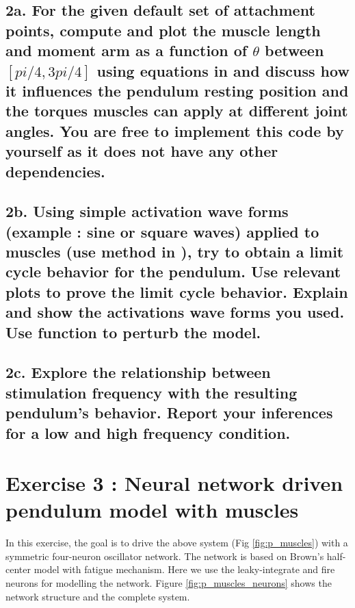 \documentclass{cmc}
\begin{document}
\label{sec:questions}

\subsection*{2a. For the given default set of attachment points,
  compute and plot the muscle length and moment arm as a function of
  $\theta$ between $[pi/4, 3pi/4]$ using equations in
   and discuss how it influences the pendulum
  resting position and the torques muscles can apply at different
  joint angles. You are free to implement this code by yourself as it
  does not have any other dependencies.}
\label{sec:2a}


\subsection*{2b. Using simple activation wave forms (example : sine or
  square waves) applied to muscles (use
   method in
  ), try to obtain a limit cycle behavior for
  the pendulum. Use relevant plots to prove the limit cycle behavior.
  Explain and show the activations wave forms you used. Use
  function to perturb the model.}
\label{sec:2c}


\subsection*{2c. Explore the relationship between stimulation
  frequency with the resulting pendulum's behavior.  Report your
  inferences for a low and high frequency condition.  }
\label{sec:2c}

\newpage
\section*{Exercise 3 : Neural network driven pendulum model with
  muscles}
\label{sec:neur-netw-driv}

In this exercise, the goal is to drive the above system (Fig
\ref{fig:p_muscles}) with a symmetric four-neuron oscillator
network. The network is based on Brown's half-center model with
fatigue mechanism. Here we use the leaky-integrate and fire neurons
for modelling the network. Figure \ref{fig:p_muscles_neurons} shows
the network structure and the complete system.
\end{document}
